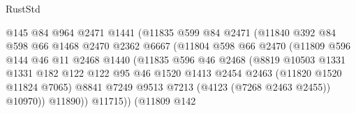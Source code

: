 \begin{lexlean}{RustStd}
\begin{coremodule}
                                @145
                                @84
                                @964
                                @2471
                                @1441
                                (@11835
                                  @599
                                  @84
                                  @2471
                                  (@11840
                                    @392
                                    @84
                                    @598
                                    @66
                                    @1468
                                    @2470
                                    @2362
                                    @6667
                                    (@11804
                                      @598
                                      @66
                                      @2470
                                      (@11809
                                        @596
                                        @144
                                        @46
                                        @11
                                        @2468
                                        @1440
                                        (@11835
                                          @596
                                          @46
                                          @2468
                                          (@8819
                                            @10503
                                            @1331
                                            @1331
                                            @182
                                            @122
                                            @122
                                            @95
                                            @46
                                            @1520
                                            @1413
                                            @2454
                                            @2463
                                            (@11820 @1520 @11824 @7065)
                                            @8841
                                            @7249
                                            @9513
                                            @7213
                                            (@4123 (@7268 @2463 @2455))
                                            @10970))
                                        @11890))
                                    @11715))
                                (@11809
                                  @142

\end{coremodule}
\end{lexlean}
